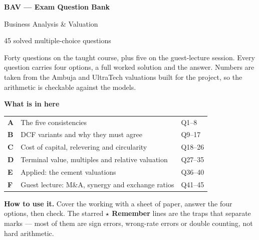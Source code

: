 \documentclass[11pt,a4paper]{article}
\begin{document}
\thispagestyle{empty}
\vspace*{6mm}
{\color{inkred}\Huge\bfseries BAV --- Exam Question Bank}\par\vspace{3mm}
{\color{inkblue}\Large Business Analysis \& Valuation}\par\vspace{1mm}
{\color{pencil}\large 45 solved multiple-choice questions}\par\vspace{6mm}

\begin{minipage}{0.97\textwidth}
{\color{inkblue}
Forty questions on the taught course, plus five on the guest-lecture session.
Every question carries four options, a full worked solution and the answer. Numbers
are taken from the Ambuja and UltraTech valuations built for the project, so the
arithmetic is checkable against the models.}
\end{minipage}

\vspace{7mm}
\begin{minipage}{0.97\textwidth}
{\color{inkblue}\bfseries What is in here}\par\vspace{2mm}
\begin{tabular}{@{}p{}p{}p{}@{}}
\textbf{A} & The five consistencies & Q1--8\\[1.5mm]
\textbf{B} & DCF variants and why they must agree & Q9--17\\[1.5mm]
\textbf{C} & Cost of capital, relevering and circularity & Q18--26\\[1.5mm]
\textbf{D} & Terminal value, multiples and relative valuation & Q27--35\\[1.5mm]
\textbf{E} & Applied: the cement valuations & Q36--40\\[1.5mm]
\textbf{F} & Guest lecture: M\&A, synergy and exchange ratios & Q41--45\\
\end{tabular}
\end{minipage}

\vspace{8mm}
\begin{minipage}{0.97\textwidth}
{\color{inkred}\bfseries How to use it.} {\color{inkblue}Cover the working with a
sheet of paper, answer the four options, then check. The starred
\textbf{$\star$ Remember} lines are the traps that separate marks --- most of them are
sign errors, wrong-rate errors or double counting, not hard arithmetic.}
\end{minipage}
\end{document}
